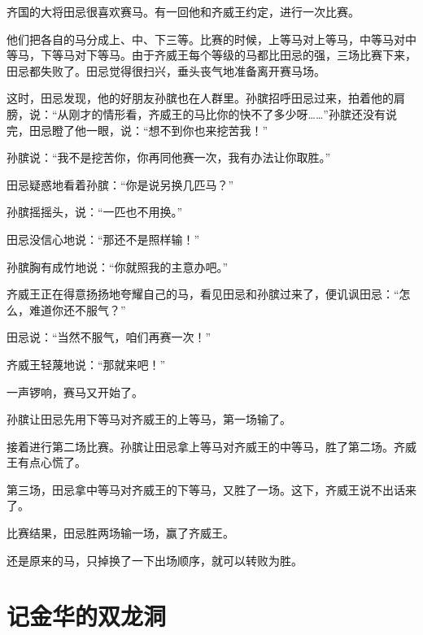\documentclass[12pt,UTF-8,openany]{ctexbook}
\begin{document}
\begin{large}
    
    齐国的大将田忌很喜欢赛马。有一回他和齐威王约定，进行一次比赛。
    
    他们把各自的马分成上、中、下三等。比赛的时候，上等马对上等马，中等马对中等马，下等马对下等马。由于齐威王每个等级的马都比田忌的强，三场比赛下来，田忌都失败了。田忌觉得很扫兴，垂头丧气地准备离开赛马场。
    
    这时，田忌发现，他的好朋友孙膑也在人群里。孙膑招呼田忌过来，拍着他的肩膀，说：“从刚才的情形看，齐威王的马比你的快不了多少呀……”孙膑还没有说完，田忌瞪了他一眼，说：“想不到你也来挖苦我！”
    
    孙膑说：“我不是挖苦你，你再同他赛一次，我有办法让你取胜。”
    
    田忌疑惑地看着孙膑：“你是说另换几匹马？”
    
    孙膑摇摇头，说：“一匹也不用换。”
    
    田忌没信心地说：“那还不是照样输！”
    
    孙膑胸有成竹地说：“你就照我的主意办吧。”
    
    齐威王正在得意扬扬地夸耀自己的马，看见田忌和孙膑过来了，便讥讽田忌：“怎么，难道你还不服气？”
    
    田忌说：“当然不服气，咱们再赛一次！”
    
    齐威王轻蔑地说：“那就来吧！”
    
    一声锣响，赛马又开始了。
    
    孙膑让田忌先用下等马对齐威王的上等马，第一场输了。
    
    接着进行第二场比赛。孙膑让田忌拿上等马对齐威王的中等马，胜了第二场。齐威王有点心慌了。
    
    第三场，田忌拿中等马对齐威王的下等马，又胜了一场。这下，齐威王说不出话来了。
    
    比赛结果，田忌胜两场输一场，赢了齐威王。
    
    还是原来的马，只掉换了一下出场顺序，就可以转败为胜。
    
\end{large}



\chapter{记金华的双龙洞}
\end{document}
